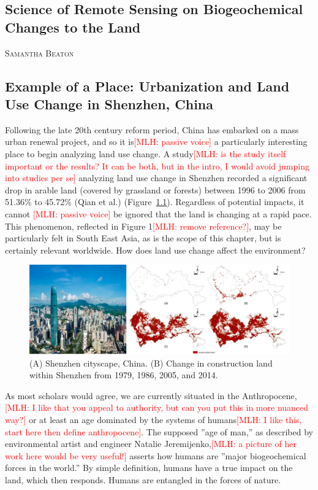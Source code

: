 \documentclass{book}\usepackage{knitr}
\makeatletter
\newcommand{\red}[1]{\textcolor{red}{[MLH: #1]}}
\newcommand{\chapterauthor}[1]{%
  {\parindent0pt\vspace*{-25pt}%
  \linespread{1.1}\large\scshape#1%
  \par\nobreak\vspace*{35pt}}
  \@afterheading%
}
\makeatother
\begin{document}
\begin{knitrout}
\begin{kframe}
\chapter[Land Use Change and Monitoring]{Science of Remote Sensing on Biogeochemical Changes to the Land}

\chapterauthor{Samantha Beaton}

\section{Example of a Place: Urbanization and Land Use Change in Shenzhen, China}

Following the late 20th century reform period, China has embarked on a mass urban renewal project, and so it is\red{passive voice} a particularly interesting place to begin analyzing land use change. A study\red{is the study itself important or the results? It can be both, but in the intro, I would avoid jumping into studies per se} analyzing land use change in Shenzhen recorded a significant drop in arable land (covered by grassland or forests) between 1996 to 2006 from 51.36\% to 45.72\% (Qian et al.) (Figure~\ref{fig:shenzhen}). Regardless of potential impacts, it cannot \red{passive voice} be ignored that the land is changing at a rapid pace. This phenomenon, reflected in Figure 1\red{remove reference?}, may be particularly felt in South East Asia, as is the scope of this chapter, but is certainly relevant worldwide. How does land use change affect the environment?

\begin{figure}
\includegraphics[width=\linewidth]{images/land-use/Shenzhen-cityscape.png}
\caption{(A) Shenzhen cityscape, China. (B) Change in construction land within Shenzhen from 1979, 1986, 2005, and 2014.}
\label{fig:shenzhen}
\end{figure}

As most scholars would agree, we are currently situated in the Anthropocene, \red{I like that you appeal to authority, but can you put this in more nuanced way?} or at least an age dominated by the systems of humans\red{I like this, start here then define anthropocene}. The supposed ''age of man,'' as described by environmental artist and engineer Natalie Jeremijenko,\red{a picture of her work here would be very useful!} asserts how humans are ''major biogeochemical forces in the world.'' By simple definition, humans have a true impact on the land, which then responds. Humans are entangled in the forces of nature. 


\end{kframe}
\end{knitrout}
\end{document}
